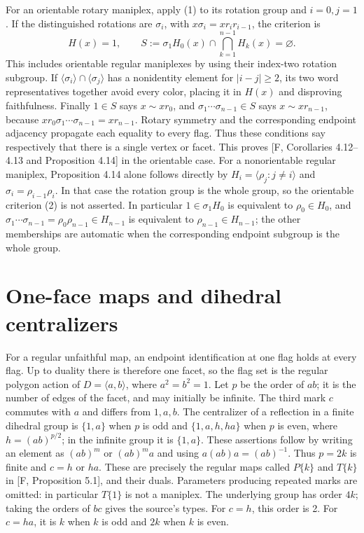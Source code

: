 \documentclass[a4paper,11pt]{article}
\newcommand{\gen}[1]{\langle#1\rangle}\newcommand{\Aut}{\operatorname{Aut}}
\begin{document}
For an orientable rotary maniplex, apply (1) to its rotation group
and $i=0,j=1$. If the distinguished rotations are
$\sigma_i$, with $x\sigma_i=xr_ir_{i-1}$, the criterion is
\[
 H(x)=1,\qquad
 S:=\sigma_1H_0(x)\cap\bigcap_{k=1}^{n-1}H_k(x)=\varnothing.
 \tag{2}
\]
This includes orientable regular maniplexes by using their index-two
rotation subgroup. If $\gen{\sigma_i}\cap\gen{\sigma_j}$ has a
nonidentity element for $|i-j|\geq2$, its two word representatives
together avoid every color, placing it in $H(x)$ and disproving
faithfulness. Finally $1\in S$ says $x\sim xr_0$, and
$\sigma_1\cdots\sigma_{n-1}\in S$ says
$x\sim xr_{n-1}$, because $xr_0\sigma_1\cdots\sigma_{n-1}
=xr_{n-1}$. Rotary symmetry and the corresponding endpoint adjacency
propagate each equality to every flag. Thus these conditions say
respectively that there is a single vertex or facet. This proves
[F, Corollaries 4.12--4.13 and Proposition 4.14] in the orientable
case. For a nonorientable regular maniplex, Proposition 4.14 alone
follows directly by $H_i=\gen{\rho_j:j\ne i}$ and
$\sigma_i=\rho_{i-1}\rho_i$. In that case the rotation group is the
whole group, so the orientable criterion (2) is not asserted. In particular
$1\in\sigma_1H_0$ is equivalent to
$\rho_0\in H_0$, and
$\sigma_1\cdots\sigma_{n-1}=\rho_0\rho_{n-1}\in H_{n-1}$
is equivalent to $\rho_{n-1}\in H_{n-1}$; the other memberships
are automatic when the corresponding endpoint subgroup is the whole
group.

\section{One-face maps and dihedral centralizers}
For a regular unfaithful map, an endpoint identification at one flag
holds at every flag. Up to duality there is therefore one facet, so
the flag set is the regular polygon action of
$D=\gen{a,b}$, where $a^2=b^2=1$. Let $p$ be the order of $ab$;
it is the number of edges of the facet, and may initially be infinite.
The third mark $c$ commutes with $a$ and differs from $1,a,b$.
The centralizer of a reflection in a finite dihedral group is
$\{1,a\}$ when $p$ is odd and $\{1,a,h,ha\}$ when $p$ is even,
where $h=(ab)^{p/2}$; in the infinite group it is $\{1,a\}$.
These assertions follow by writing an element as $(ab)^m$ or
$(ab)^ma$ and using $a(ab)a=(ab)^{-1}$.
Thus $p=2k$ is finite and $c=h$ or $ha$. These are precisely the
regular maps called $P\{k\}$ and $T\{k\}$ in [F, Proposition 5.1],
and their duals. Parameters producing repeated marks are omitted:
in particular $T\{1\}$ is not a maniplex. The underlying group has
order $4k$; taking the orders of $bc$ gives the source's types.
For $c=h$, this order is 2. For $c=ha$, it is $k$ when $k$ is odd
and $2k$ when $k$ is even.
\end{document}

